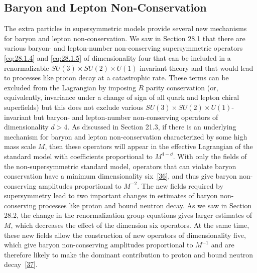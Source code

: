
\subsection{Baryon and Lepton Non-Conservation}

The extra particles in supersymmetric models provide several new mechanisms
for baryon and lepton non-conservation. We saw in Section 28.1 that there are
various baryon- and lepton-number non-conserving supersymmetric operators
\eqref{eq:28.1.4} and \eqref{eq:28.1.5} of dimensionality four that can be
included in a renormalizable
\(SU(3)\times SU(2)\times U(1)\)-invariant theory and that
would lead to processes like proton decay at a catastrophic rate. These
terms can be excluded from the Lagrangian by imposing \(R\) parity
conservation (or, equivalently, invariance under a change of sign of all
quark and lepton chiral superfields) but this does not exclude various
\(SU(3)\times SU(2)\times U(1)\)-invariant but baryon- and
lepton-number non-conserving operators of dimensionality \(d>4\). As
discussed in Section 21.3, if there is an underlying mechanism for baryon
and lepton non-conservation characterized by some high mass scale \(M\),
then these operators will appear in the effective Lagrangian of the
standard model with coefficients proportional to \(M^{4-\dd}\). With only
the fields of the non-supersymmetric standard model, operators that can
violate baryon conservation have a minimum dimensionality
six~\hyperref[ch28-ref-36]{[36]}, and thus give baryon
non-conserving amplitudes proportional to \(M^{-2}\). The new fields
required by supersymmetry lead to two important changes in estimates of
baryon non-conserving processes like proton and bound neutron decay. As we
saw in Section 28.2, the change in the renormalization group equations gives
larger estimates of \(M\), which decreases the effect of the dimension six
operators. At the same time, these new fields allow the construction of new
operators of dimensionality five, which give baryon non-conserving
amplitudes proportional to \(M^{-1}\) and are therefore likely to make the
dominant contribution to proton and bound neutron
decay~\hyperref[ch28-ref-37]{[37]}.

